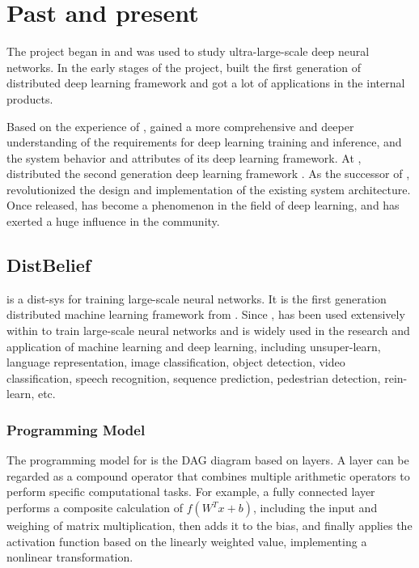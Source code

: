 \section{Past and present}
\begin{content}
The  project began in  and was used to study ultra-large-scale deep neural networks. In the early stages of the project,  built the first generation of distributed deep learning framework  and got a lot of applications in the  internal products.

Based on the experience of ,  gained a more comprehensive and deeper understanding of the requirements for deep learning training and inference, and the system behavior and attributes of its deep learning framework. At ,  distributed the second generation  deep learning framework \tf{}.  As the successor of , \tf{} revolutionized the design and implementation of the existing system architecture.  Once released, \tf{} has become a phenomenon in the field of deep learning, and has exerted a huge influence in the community.


\subsection{DistBelief}
 is a \gls{dist-sys} for training large-scale neural networks. It is the first generation distributed machine learning framework from . Since ,  has been used extensively within  to train large-scale neural networks and is widely used in the research and application of machine learning and deep learning, including \gls{unsuper-learn}, language representation, image classification, object detection, video classification, speech recognition, sequence prediction, pedestrian detection, \gls{rein-learn}, etc.


\subsubsection{Programming Model}
The programming model for  is the \gls{DAG} diagram based on \glspl{layer}. A layer can be regarded as a compound operator that combines multiple arithmetic operators to perform specific computational tasks. For example, a fully connected layer performs a composite calculation of $f({W^T}x + b)$, including the  input and weighing of matrix multiplication, then adds it to the bias, and finally applies the activation function based on the linearly weighted value, implementing a nonlinear transformation.



\end{content}
